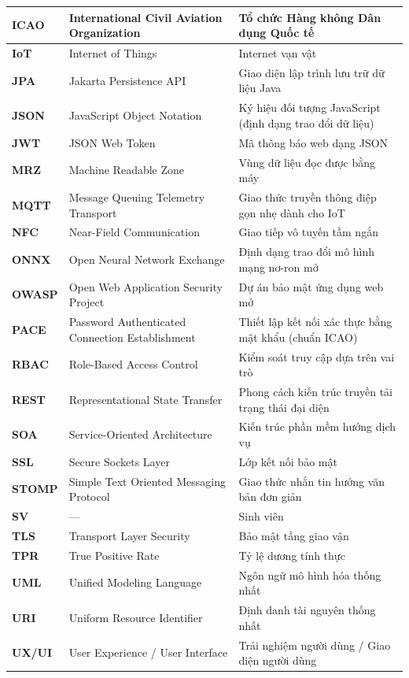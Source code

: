 \documentclass[../DoAn.tex]{subfiles}
\begin{document}
\begin{longtable}{|l|p{6.5cm}|p{6.5cm}|}
\textbf{ICAO} & International Civil Aviation Organization & Tổ chức Hàng không Dân dụng Quốc tế \\ \hline
\textbf{IoT} & Internet of Things & Internet vạn vật \\ \hline
\textbf{JPA} & Jakarta Persistence API & Giao diện lập trình lưu trữ dữ liệu Java \\ \hline
\textbf{JSON} & JavaScript Object Notation & Ký hiệu đối tượng JavaScript (định dạng trao đổi dữ liệu) \\ \hline
\textbf{JWT} & JSON Web Token & Mã thông báo web dạng JSON \\ \hline
\textbf{MRZ} & Machine Readable Zone & Vùng dữ liệu đọc được bằng máy \\ \hline
\textbf{MQTT} & Message Queuing Telemetry Transport & Giao thức truyền thông điệp gọn nhẹ dành cho IoT \\ \hline
\textbf{NFC} & Near-Field Communication & Giao tiếp vô tuyến tầm ngắn \\ \hline
\textbf{ONNX} & Open Neural Network Exchange & Định dạng trao đổi mô hình mạng nơ-ron mở \\ \hline
\textbf{OWASP} & Open Web Application Security Project & Dự án bảo mật ứng dụng web mở \\ \hline
\textbf{PACE} & Password Authenticated Connection Establishment & Thiết lập kết nối xác thực bằng mật khẩu (chuẩn ICAO) \\ \hline
\textbf{RBAC} & Role-Based Access Control & Kiểm soát truy cập dựa trên vai trò \\ \hline
\textbf{REST} & Representational State Transfer & Phong cách kiến trúc truyền tải trạng thái đại diện \\ \hline
\textbf{SOA} & Service-Oriented Architecture & Kiến trúc phần mềm hướng dịch vụ \\ \hline
\textbf{SSL} & Secure Sockets Layer & Lớp kết nối bảo mật \\ \hline
\textbf{STOMP} & Simple Text Oriented Messaging Protocol & Giao thức nhắn tin hướng văn bản đơn giản \\ \hline
\textbf{SV} & — & Sinh viên \\ \hline
\textbf{TLS} & Transport Layer Security & Bảo mật tầng giao vận \\ \hline
\textbf{TPR} & True Positive Rate & Tỷ lệ dương tính thực \\ \hline
\textbf{UML} & Unified Modeling Language & Ngôn ngữ mô hình hóa thống nhất \\ \hline
\textbf{URI} & Uniform Resource Identifier & Định danh tài nguyên thống nhất \\ \hline
\textbf{UX/UI} & User Experience / User Interface & Trải nghiệm người dùng / Giao diện người dùng \\ \hline
\end{longtable}
\end{document}
